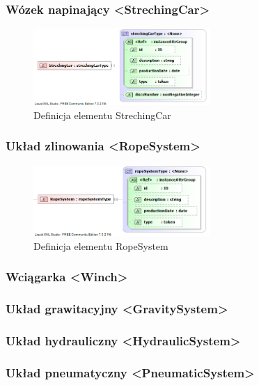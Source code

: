 \documentclass[12pt,a4paper]{article}
\begin{document}
\subsubsection{Wózek napinający <StrechingCar>}

\begin{figure}[h]
  \centering
  \includegraphics[width=0.6\textwidth]{png/liquid/StrechingCar}
  \caption{Definicja elementu StrechingCar}
  \label{fig:strechingCar-xsd}
\end{figure}


\subsubsection{Układ zlinowania <RopeSystem>}

\begin{figure}[h]
  \centering
  \includegraphics[width=0.6\textwidth]{png/liquid/RopeSystem}
  \caption{Definicja elementu RopeSystem}
  \label{fig:ropeSystem-xsd}
\end{figure}


\subsubsection{Wciągarka <Winch>}


\subsubsection{Układ grawitacyjny <GravitySystem>}


\subsubsection{Układ hydrauliczny <HydraulicSystem>}


\subsubsection{Układ pneumatyczny <PneumaticSystem>}
\end{document}

